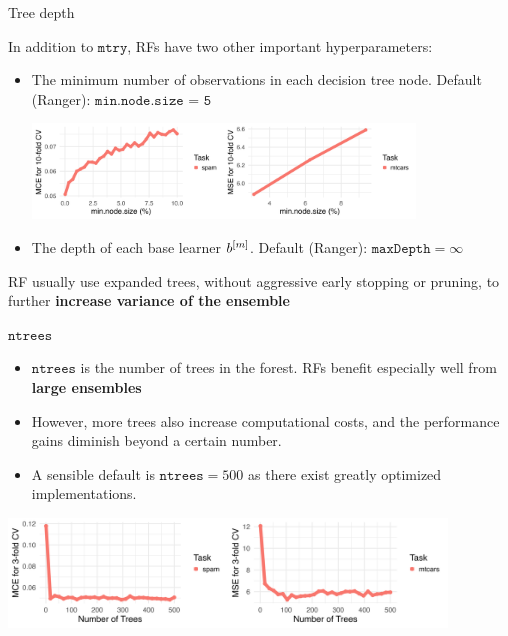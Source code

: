 \documentclass[11pt,compress,t,notes=noshow, xcolor=table]{beamer}
\begin{document}
\begin{vbframe}{Tree depth}

In addition to $\texttt{mtry}$, RFs have two other important hyperparameters:

\begin{itemize}
  \item The minimum number of observations in each decision tree node. Default (Ranger): $\texttt{min.node.size = 5}$ 
\begin{center}
\includegraphics[width=0.8\textwidth]{figure/forest-minnode.png}
\end{center}
  \item The depth of each base learner $b^{[m]}$. Default (Ranger): $\texttt{maxDepth} = \infty$
\end{itemize}

RF usually use expanded trees, without aggressive early stopping or pruning, to further \textbf{increase variance of the ensemble} 
\end{vbframe}

\begin{vbframe}{$\texttt{ntrees}$}
\begin{itemize}
\item $\texttt{ntrees}$ is the number of trees in the forest. RFs benefit especially well from \textbf{large ensembles} 
\item However, more trees also increase computational costs, and the performance gains diminish beyond a certain number.
\item A sensible default is $\texttt{ntrees} = 500$ as there exist greatly optimized implementations.
\end{itemize}

\begin{center}
\includegraphics[width=330pt]{figure/forest-ntree.png}
\end{center}
\end{vbframe}
\end{document}
